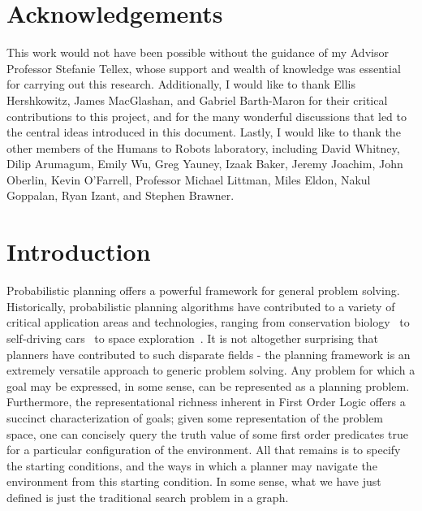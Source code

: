 \documentclass[11pt]{article}
\begin{document}
\newpage

\section*{Acknowledgements}
This work would not have been possible without the guidance of my Advisor Professor Stefanie Tellex, whose support and wealth of knowledge was essential for carrying out this research. Additionally, I would like to thank Ellis Hershkowitz, James MacGlashan, and Gabriel Barth-Maron for their critical contributions to this project, and for the many wonderful discussions that led to the central ideas introduced in this document. Lastly, I would like to thank the other members of the Humans to Robots laboratory, including David Whitney, Dilip Arumagum, Emily Wu, Greg Yauney, Izaak Baker, Jeremy Joachim, John Oberlin, Kevin O'Farrell, Professor Michael Littman, Miles Eldon, Nakul Goppalan, Ryan Izant, and Stephen Brawner.

\newpage
\tableofcontents
\newpage

\section{Introduction}
\label{sec:introduction}

Probabilistic planning offers a powerful framework for general problem solving. Historically, probabilistic planning algorithms have contributed to a variety of critical application areas and technologies, ranging from conservation biology~\cite{possingham1997state} to self-driving cars~\cite{thrun2006stanley,montemerlo2008junior} to space exploration~\cite{bresina2005activity,backes1999automated,chien2000aspen}. It is not altogether surprising that planners have contributed to such disparate fields - the planning framework is an extremely versatile approach to generic problem solving. Any problem for which a goal may be expressed, in some sense, can be represented as a planning problem. Furthermore, the representational richness inherent in First Order Logic offers a succinct characterization of goals; given some representation of the problem space, one can concisely query the truth value of some first order predicates true for a particular configuration of the environment. All that remains is to specify the starting conditions, and the ways in which a planner may navigate the environment from this starting condition. In some sense, what we have just defined is just the traditional search problem in a graph.
\end{document}
